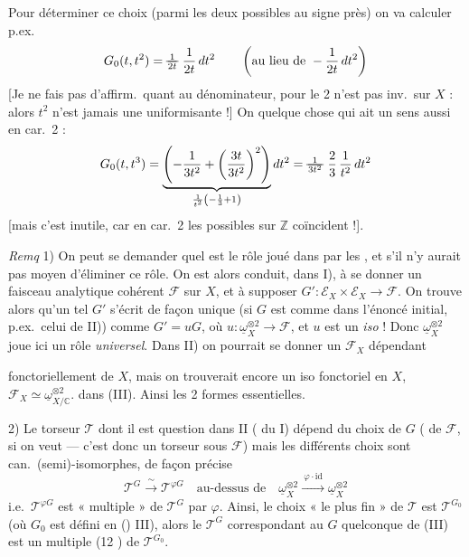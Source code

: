 \documentclass[11pt,a4paper]{article}
\begin{document}
Pour déterminer ce choix (parmi les deux possibles au signe près) on va calculer p.ex.
\[
G_0(t, t^2) = \text{\struck{$\frac{1}{2t}$}}\ \frac{1}{2t}\, dt^2 \qquad \left(\text{au lieu de } -\frac{1}{2t}\, dt^2\right)
\]
[Je ne fais pas d'affirm.\ quant au dénominateur, pour le  2 n'est pas inv.\ sur $X$ : alors $t^2$ n'est jamais une uniformisante !] On   quelque chose qui ait un sens aussi en car.\ 2 :
\[
G_0(t, t^3) = \underbrace{\left( -\frac{1}{3t^2} + \left( \frac{3t}{3t^2} \right)^2 \right)}_{\frac{1}{t^2}\left(-\frac{1}{3} + 1\right)} dt^2 = \text{\struck{$\frac{1}{3t^2}$}}\ \frac{2}{3}\, \frac{1}{t^2}\, dt^2
\]
[mais c'est inutile, car en car.\ 2 les   possibles sur $\mathbb{Z}$ coïncident !].

\emph{Remq} 1) On peut se demander quel est le rôle joué dans  par les , et s'il n'y aurait pas moyen d'éliminer ce rôle. On est alors conduit, dans I), à se donner un faisceau analytique cohérent $\mathcal{F}$ sur $X$, et à supposer $G' : \mathcal{E}_X \times \mathcal{E}_X \to \mathcal{F}$. On trouve alors qu'un tel $G'$ s'écrit de façon unique (si $G$ est comme dans l'énoncé initial, p.ex.\ celui de II)) comme $G' = uG$, où $u : \underline{\omega}_X^{\otimes 2} \to \mathcal{F}$, et   $u$ est un \emph{iso} ! Donc $\underline{\omega}_X^{\otimes 2}$ joue ici un rôle \emph{universel}. Dans II) on pourrait se donner un $\mathcal{F}_X$ dépendant

fonctoriellement de $X$, mais on trouverait encore un iso fonctoriel en $X$, $\mathcal{F}_X \simeq \underline{\omega}^{\otimes 2}_{X/\mathbb{C}}$.  dans (III). Ainsi les 2 formes  essentielles.

2)  Le torseur $\mathcal{T}$ dont il est question dans II ( du I) dépend du choix de $G$ ( de $\mathcal{F}$, si on veut — c'est donc un torseur sous $\mathcal{F}$) mais les  différents choix sont can.\ (semi)-isomorphes, de façon précise
\[
\mathcal{T}^G \xrightarrow{\ \sim\ } \mathcal{T}^{\varphi G}
\quad \text{au-dessus de} \quad
\underline{\omega}_X^{\otimes 2} \xrightarrow{\ \varphi \cdot \mathrm{id}\ } \underline{\omega}_X^{\otimes 2}
\]
i.e.\ $\mathcal{T}^{\varphi G}$ est « multiple » de $\mathcal{T}^G$ par $\varphi$.  Ainsi, le choix « le plus fin » de $\mathcal{T}$ est $\mathcal{T}^{G_0}$ (où $G_0$ est défini en () III), alors le $\mathcal{T}^G$ correspondant au $G$ quelconque de (III) est un multiple (12  \ill{}) de $\mathcal{T}^{G_0}$.
\end{document}
